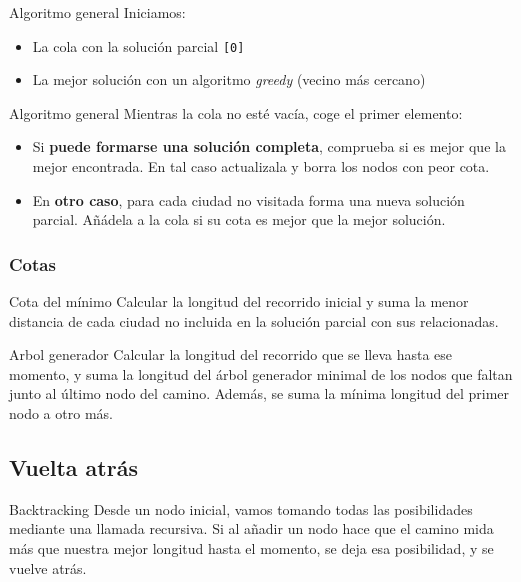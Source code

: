 \begin{frame}{Algoritmo general}
  Iniciamos:
  \begin{itemize}
    \item La cola con la solución parcial \texttt{[0]}
    \item La mejor solución con un algoritmo \textit{greedy} (vecino más cercano)
  \end{itemize}
\end{frame}

\begin{frame}{Algoritmo general}
  Mientras la cola no esté vacía, coge el primer elemento:
  \begin{itemize}
    \item Si \textbf{puede formarse una solución completa}, comprueba si es mejor que la mejor encontrada. En tal caso actualizala y borra los nodos con peor cota.
    \item En \textbf{otro caso}, para cada ciudad no visitada forma una nueva solución parcial. Añádela a la cola si su cota es mejor que la mejor solución.
  \end{itemize}
\end{frame}

\subsubsection{Cotas}

\begin{frame}{Cota del mínimo}
  Calcular la longitud del recorrido inicial y suma la menor distancia de cada ciudad no incluida en la solución parcial con sus relacionadas.
\end{frame}

\begin{frame}{Arbol generador}
  Calcular la longitud del recorrido que se lleva hasta ese momento, y suma la longitud del árbol generador minimal de los nodos que faltan junto al último nodo del camino. Además, se suma la mínima longitud del primer nodo a otro más.

\end{frame}

\subsection{Vuelta atrás}

\begin{frame}{Backtracking}
  Desde un nodo inicial, vamos tomando todas las posibilidades mediante una llamada recursiva. Si al añadir un nodo hace que el camino mida más que nuestra mejor longitud hasta el momento, se deja esa posibilidad, y se vuelve atrás.
\end{frame}


